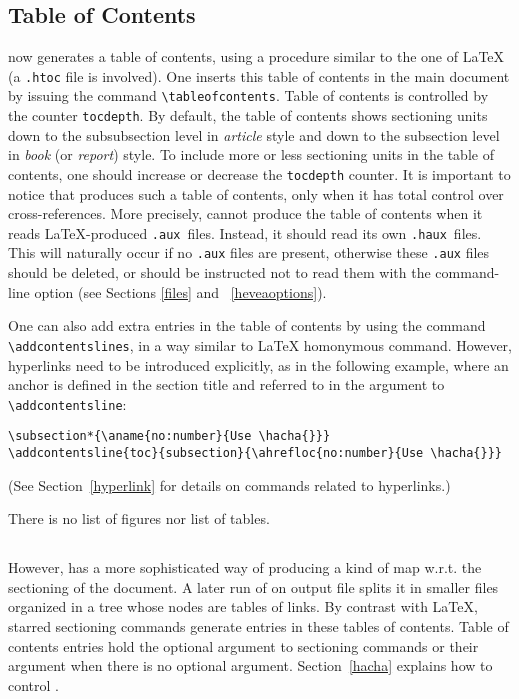 \subsection{Table of Contents}
%
%
\hevea{} now generates a table of contents, using a procedure similar
to the one of \LaTeX
(a \texttt{.htoc} file is involved).
One inserts this table of contents in the main document by issuing
the command \verb+\tableofcontents+.
Table of contents is controlled by the counter  \verb+tocdepth+.
By default, the table of contents shows sectioning units down to the
subsubsection level in \textit{article} style and down to the subsection level
in \textit{book} (or \textit{report}) style. To include more or less
sectioning units in the
table of contents, one should increase or decrease the \verb+tocdepth+
counter.
It is important to notice that \hevea{} produces such a table of
contents, only when it has total control over cross-references.
More precisely, \hevea{} cannot produce the table of contents when it
reads \LaTeX{}-produced \texttt{.aux}~files.
Instead, it should read its own \texttt{.haux}~files.
This will naturally occur if no \texttt{.aux} files are present,
otherwise these \texttt{.aux} files should be deleted, or \hevea{}
should be instructed not to read them with the command-line option
(see Sections \ref{files} and ~\ref{heveaoptions}).

One can also add extra entries in the table of contents by using
the command \verb+\addcontentslines+, in a way similar
to \LaTeX{} homonymous command.
However, hyperlinks need to be introduced explicitly,
as in the following example, where
an anchor is defined in the section title and referred to in the
argument to \verb+\addcontentsline+:
\begin{verbatim}
\subsection*{\aname{no:number}{Use \hacha{}}}
\addcontentsline{toc}{subsection}{\ahrefloc{no:number}{Use \hacha{}}}
\end{verbatim}
(See Section~\ref{hyperlink} for details on commands related to hyperlinks.)

There is no list of figures nor list of tables.

\subsection*{}
However, \hevea{} has a more sophisticated way of producing
a kind of map w.r.t. the sectioning of the document.
A later run of {\hacha} on \hevea{} output file splits it
in smaller files organized in a tree whose nodes are tables of
links.
By contrast with \LaTeX{}, starred sectioning commands generate
entries in these tables of contents.
Table of contents entries hold the optional argument to sectioning
commands or their argument when there is no optional
argument. Section~\ref{hacha} explains how to
control {\hacha}.

